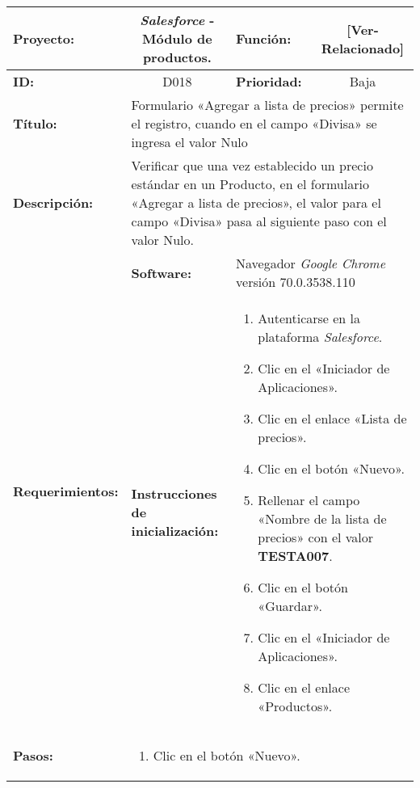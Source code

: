 \begin{table}[H]
\centering
\begin{tabular}{|p{2.5cm}|p{2.8cm}|p{2.2cm}|p{2.8cm}|p{2.2cm}|}
\hline
\footnotesize{\textbf{Proyecto:}} &
\multicolumn{2}{c|}{\footnotesize{\emph{Salesforce} - Módulo de productos.}} &
\footnotesize{\textbf{Función:}} &
\multicolumn{1}{c|}{\footnotesize{[Ver-Relacionado]}} \\
\hline
\footnotesize{\textbf{ID:}} & \multicolumn{2}{c|}{\footnotesize{D018}} &
\footnotesize{\textbf{Prioridad:}} &
\multicolumn{1}{c|}{\footnotesize{Baja}} \\
\hline
\footnotesize{\textbf{Título:}} &
\multicolumn{4}{p{12.4cm}|}{\footnotesize{Formulario «Agregar a lista de
precios» permite el registro, cuando en el campo «Divisa» se ingresa
el valor Nulo}} \\
\hline
\footnotesize{\textbf{Descripción:}} &
\multicolumn{4}{p{12.4cm}|}{\footnotesize{Verificar que una vez establecido un
precio estándar en un Producto, en el formulario «Agregar a lista de precios»,
el valor para el campo «Divisa» pasa al siguiente paso con el valor
Nulo.}} \\
\hline
\multirow{2}{*}{\footnotesize{\textbf{Requerimientos:}}} &
\footnotesize{\textbf{Software:}} &
\multicolumn{3}{p{7.8cm}|}{\footnotesize{Navegador \emph{Google Chrome}
versión 70.0.3538.110}} \\
\cline{2-5}
& \footnotesize{\textbf{Instrucciones de inicialización:}} &
\multicolumn{3}{p{7.8cm}|}{\footnotesize{
\begin{enumerate}
\item Autenticarse en la plataforma \emph{Salesforce}.
\item Clic en el «Iniciador de Aplicaciones».
\item Clic en el enlace «Lista de precios».
\item Clic en el botón «Nuevo».
\item Rellenar el campo «Nombre de la lista de precios» con el valor
    \textbf{TESTA007}.
\item Clic en el botón «Guardar».
\item Clic en el «Iniciador de Aplicaciones».
\item Clic en el enlace «Productos».
\end{enumerate}
}} \\
\hline
\footnotesize{\textbf{Pasos:}} &
\multicolumn{4}{p{11.8cm}|}{\footnotesize{
\begin{enumerate}
\item Clic en el botón «Nuevo».

\end{enumerate}}}
\end{tabular}
\end{table}

